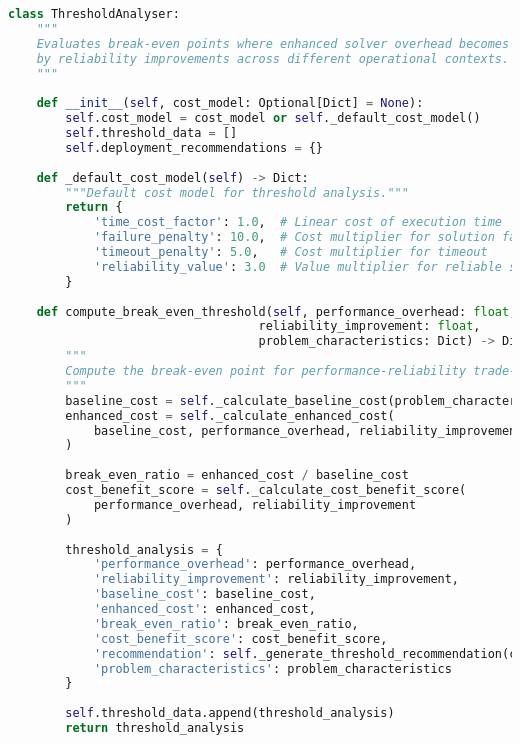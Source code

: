 \begin{lstlisting}[language=Python, caption=Cost-Benefit Threshold Analysis for Deployment Guidance]
class ThresholdAnalyser:
    """
    Evaluates break-even points where enhanced solver overhead becomes justified 
    by reliability improvements across different operational contexts.
    """
    
    def __init__(self, cost_model: Optional[Dict] = None):
        self.cost_model = cost_model or self._default_cost_model()
        self.threshold_data = []
        self.deployment_recommendations = {}
    
    def _default_cost_model(self) -> Dict:
        """Default cost model for threshold analysis."""
        return {
            'time_cost_factor': 1.0,  # Linear cost of execution time
            'failure_penalty': 10.0,  # Cost multiplier for solution failure
            'timeout_penalty': 5.0,   # Cost multiplier for timeout
            'reliability_value': 3.0  # Value multiplier for reliable solution
        }
    
    def compute_break_even_threshold(self, performance_overhead: float, 
                                   reliability_improvement: float,
                                   problem_characteristics: Dict) -> Dict:
        """
        Compute the break-even point for performance-reliability trade-off.
        """
        baseline_cost = self._calculate_baseline_cost(problem_characteristics)
        enhanced_cost = self._calculate_enhanced_cost(
            baseline_cost, performance_overhead, reliability_improvement
        )
        
        break_even_ratio = enhanced_cost / baseline_cost
        cost_benefit_score = self._calculate_cost_benefit_score(
            performance_overhead, reliability_improvement
        )
        
        threshold_analysis = {
            'performance_overhead': performance_overhead,
            'reliability_improvement': reliability_improvement,
            'baseline_cost': baseline_cost,
            'enhanced_cost': enhanced_cost,
            'break_even_ratio': break_even_ratio,
            'cost_benefit_score': cost_benefit_score,
            'recommendation': self._generate_threshold_recommendation(cost_benefit_score),
            'problem_characteristics': problem_characteristics
        }
        
        self.threshold_data.append(threshold_analysis)
        return threshold_analysis
    

\end{lstlisting}
